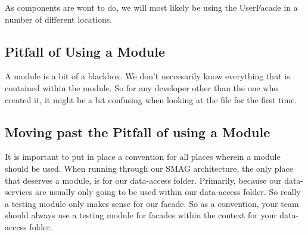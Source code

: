 As components are wont to do, we will most likely be using the UserFacade in a
number of different locations.

\subsection{Pitfall of Using a Module}
A module is a bit of a blackbox. We don't neccesarily know everything that is
contained within the module. So for any developer other than the one who
created it, it might be a bit confusing when looking at the file for the first
time.

\subsection{Moving past the Pitfall of using a Module}
It is important to put in place a convention for all places wherein a module
should be used. When running through our SMAG architecture, the only place that
deserves a module, is for our data-access folder. Primarily, because our
data-services are usually only going to be used within our data-access folder.
So really a testing module only makes sense for our facade. So as a convention,
your team should always use a testing module for facades within the context for
your data-access folder.
